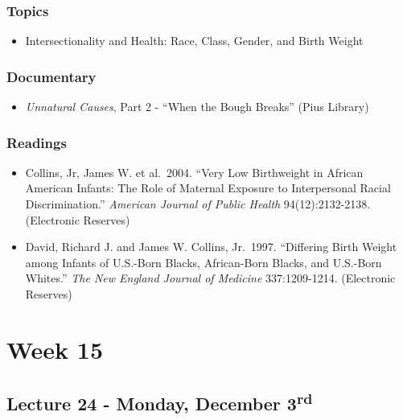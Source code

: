 \documentclass[]{book}
\providecommand{\tightlist}{%
  \setlength{\itemsep}{0pt}\setlength{\parskip}{0pt}}
\theoremstyle{definition}
\theoremstyle{definition}
\theoremstyle{definition}
\theoremstyle{remark}
\begin{document}
\hypertarget{topics-27}{%
\subsubsection*{Topics}\label{topics-27}}

\begin{itemize}
\tightlist
\item
  Intersectionality and Health: Race, Class, Gender, and Birth Weight
\end{itemize}

\hypertarget{documentary-4}{%
\subsubsection*{Documentary}\label{documentary-4}}

\begin{itemize}
\tightlist
\item
  \emph{Unnatural Causes}, Part 2 - ``When the Bough Breaks'' (Pius
  Library)
\end{itemize}

\hypertarget{readings-25}{%
\subsubsection*{Readings}\label{readings-25}}

\begin{itemize}
\tightlist
\item
  Collins, Jr, James W. et al.~2004. ``Very Low Birthweight in African
  American Infants: The Role of Maternal Exposure to Interpersonal
  Racial Discrimination.'' \emph{American Journal of Public Health}
  94(12):2132-2138. (Electronic Reserves)
\item
  David, Richard J. and James W. Collins, Jr.~1997. ``Differing Birth
  Weight among Infants of U.S.-Born Blacks, African-Born Blacks, and
  U.S.-Born Whites.'' \emph{The New England Journal of Medicine}
  337:1209-1214. (Electronic Reserves)
\end{itemize}

\hypertarget{week-15}{%
\section*{Week 15}\label{week-15}}

\hypertarget{lecture-24---monday-december-3rd}{%
\subsection*{\texorpdfstring{Lecture 24 - Monday, December
3\textsuperscript{rd}}{Lecture 24 - Monday, December 3rd}}\label{lecture-24---monday-december-3rd}}
\end{document}
